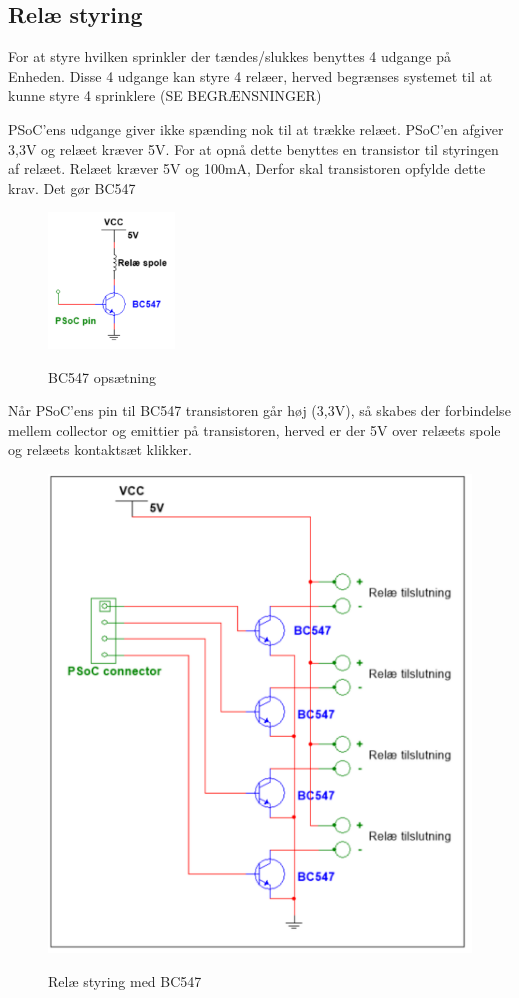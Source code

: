 \subsection{Relæ styring}
For at styre hvilken sprinkler der tændes/slukkes benyttes 4 udgange på Enheden. Disse 4 udgange kan styre 4 relæer, herved begrænses systemet til at kunne styre 4 sprinklere (SE BEGRÆNSNINGER)

PSoC'ens udgange giver ikke spænding nok til at trække relæet. PSoC'en afgiver 3,3V og relæet kræver 5V. For at opnå dette benyttes en transistor til styringen af relæet. Relæet kræver 5V og 100mA, Derfor skal transistoren opfylde dette krav. Det gør BC547 

\begin{figure}[H] \centering
{\includegraphics[width=0.3\textwidth]{filer/design/Billeder/BC547}}
\caption{BC547 opsætning}
\label{lab:BC547}
\raggedright
\end{figure} 

Når PSoC'ens pin til BC547 transistoren går høj (3,3V), så skabes der forbindelse mellem collector og emittier på transistoren, herved er der 5V over relæets spole og relæets kontaktsæt klikker. 


\begin{figure}[H] \centering
{\includegraphics[width=\textwidth]{filer/design/Billeder/RELAY_CONTROL}}
\caption{Relæ styring med BC547}
\label{lab:RELAY_CONTROL}
\raggedright
\end{figure} 




 